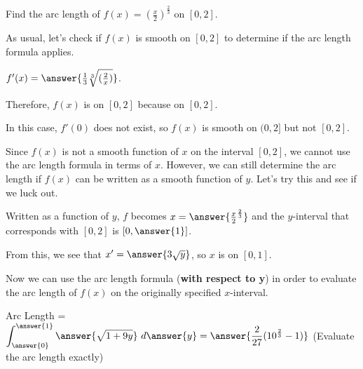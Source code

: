 \documentclass[handout,nooutcomes]{ximera}
\begin{document}
\begin{problem}
Find the arc length of $f(x) = \left(\frac{x}{2}\right)^{\frac{2}{3}}$ on $[0,2]$.  

As usual, let's check if $f(x)$ is smooth on $[0,2]$ to determine if the arc length formula applies.

$f'(x) = \answer{\frac{1}{3}\sqrt[3]{(\frac{2}{x})}}$.  

Therefore, $f(x)$ is  on $[0,2]$ because  on $[0,2]$.  

\begin{feedback}[correct]
In this case, $f'(0)$ does not exist, so $f(x)$ is smooth on $(0,2]$ but not $[0,2]$.
\end{feedback}

\begin{problem}
Since $f(x)$ is not a smooth function of $x$ on the interval $[0,2]$, we cannot use the arc length formula in terms of $x$.  However, we can still determine the arc length if $f(x)$ can be written as a smooth function of $y$.  Let's try this and see if we luck out.  

Written as a function of $y$, $f$ becomes $x = \answer{\frac{x}{2}^{\frac{2}{3}}}$ and the $y$-interval that corresponds with $[0,2]$ is $[0, \answer{1}]$.  

\begin{problem}
From this, we see that $x' = \answer{3\sqrt{y}}$, so $x$ is  on $[0,1]$.  

\begin{problem}
Now we can use the arc length formula (\textbf{with respect to y}) in order to evaluate the arc length of $f(x)$ on the originally specified $x$-interval. 

Arc Length = $\displaystyle\int_{\answer{0}}^{\answer{1}} \answer{\sqrt{1+9y}} \ d\answer{y} = \answer{\frac{2}{27}(10^{\frac{2}{3}}-1)}$ (Evaluate the arc length exactly)

\end{problem}
\end{problem}
\end{problem}
\end{problem}

\end{document}
